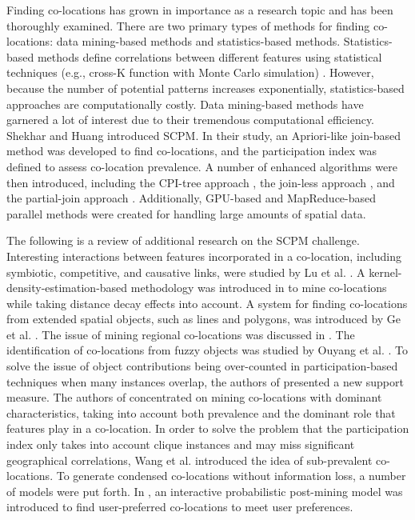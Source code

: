 \documentclass[12pt, letterpaper]{template}
\theoremstyle{definition}
\begin{document}
Finding co-locations has grown in importance as a research topic and has been thoroughly examined. There are two primary types of methods for finding co-locations: data mining-based methods and statistics-based methods. Statistics-based methods define correlations between different features using statistical techniques (e.g., cross-K function with Monte Carlo simulation) \cite{barua2013mining, cai2018adaptive}. However, because the number of potential patterns increases exponentially, statistics-based approaches are computationally costly. Data mining-based methods have garnered a lot of interest due to their tremendous computational efficiency. Shekhar and Huang \cite{huang2004discovering, shekhar2001discovering} introduced SCPM. In their study, an Apriori-like join-based method was developed to find co-locations, and the participation index was defined to assess co-location prevalence. A number of enhanced algorithms were then introduced, including the CPI-tree approach \cite{wang2008investigation}, the join-less approach \cite{yoo2006joinless}, and the partial-join approach \cite{yoo2004partial}. Additionally, GPU-based \cite{andrzejewski2015parallel} and MapReduce-based \cite{yang2018parallel,yang2018parallel2} parallel methods were created for handling large amounts of spatial data.

The following is a review of additional research on the SCPM challenge. Interesting interactions between features incorporated in a co-location, including symbiotic, competitive, and causative links, were studied by Lu et al. \cite{lu2018mining,lu2017mining}. A kernel-density-estimation-based methodology was introduced in \cite{yao2017co} to mine co-locations while taking distance decay effects into account. A system for finding co-locations from extended spatial objects, such as lines and polygons, was introduced by Ge et al. \cite{ge2019computing}. The issue of mining regional co-locations was discussed in \cite{cai2018adaptive}. The identification of co-locations from fuzzy objects was studied by Ouyang et al. \cite{ouyang2017spatial}. To solve the issue of object contributions being over-counted in participation-based techniques when many instances overlap, the authors of \cite{chan2019fraction} presented a new support measure. The authors of \cite{fang2017mining} concentrated on mining co-locations with dominant characteristics, taking into account both prevalence and the dominant role that features play in a co-location. In order to solve the problem that the participation index only takes into account clique instances and may miss significant geographical correlations, Wang et al. \cite{wang2019mining} introduced the idea of sub-prevalent co-locations. To generate condensed co-locations without information loss, a number of models \cite{liu2015rcp, wang2018effective, wang2017redundancy} were put forth. In \cite{wang2018interactive}, an interactive probabilistic post-mining model was introduced to find user-preferred co-locations to meet user preferences.
\end{document}
